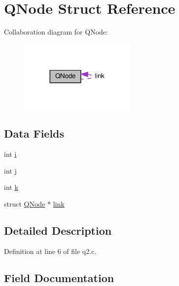 \hypertarget{struct_q_node}{}\section{Q\+Node Struct Reference}
\label{struct_q_node}


Collaboration diagram for Q\+Node\+:\nopagebreak
\begin{figure}[H]
\begin{center}
\leavevmode
\includegraphics[width=164pt]{struct_q_node__coll__graph}
\end{center}
\end{figure}
\subsection*{Data Fields}
\begin{DoxyCompactItemize}
\item 
int \hyperlink{struct_q_node_acb559820d9ca11295b4500f179ef6392}{i}
\item 
int \hyperlink{struct_q_node_a37d972ae0b47b9099e30983131d31916}{j}
\item 
int \hyperlink{struct_q_node_ab66ed8e0098c0a86b458672a55a9cca9}{k}
\item 
struct \hyperlink{struct_q_node}{Q\+Node} $\ast$ \hyperlink{struct_q_node_aeb974434dabad67698cafa3278f141a0}{link}
\end{DoxyCompactItemize}


\subsection{Detailed Description}


Definition at line 6 of file q2.\+c.



\subsection{Field Documentation}
\mbox{\label{struct_q_node_acb559820d9ca11295b4500f179ef6392}} 
